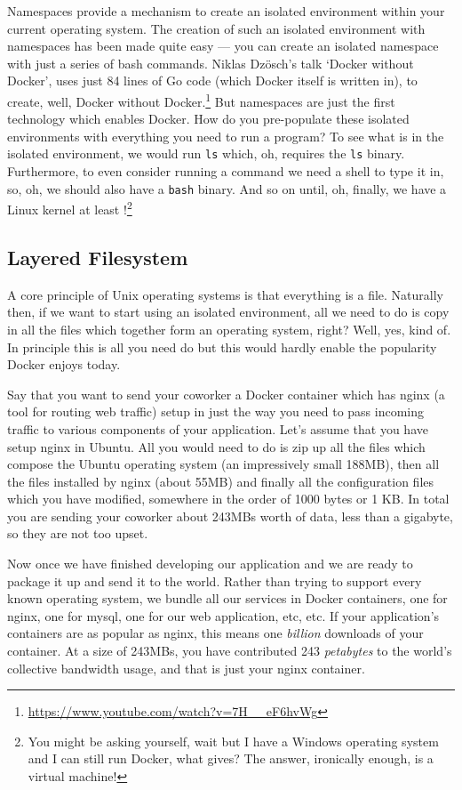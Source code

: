 Namespaces provide a mechanism to create an isolated environment within your current operating system.
The creation of such an isolated environment with namespaces has been made quite easy --- you can create an isolated namespace with just a series of bash commands.
Niklas Dz{\"o}sch's talk `Docker without Docker', uses just 84 lines of Go code (which Docker itself is written in),
to create, well, Docker without Docker.\footnote{\url{https://www.youtube.com/watch?v=7H__eF6hvWg}}
But namespaces are just the first technology which enables Docker.
How do you pre-populate these isolated environments with everything you need to run a program?
To see what is in the isolated environment, we would run \texttt{ls} which, oh, requires the \texttt{ls} binary.
Furthermore, to even consider running a command we need a shell to type it in, so, oh, we should also have a \texttt{bash} binary.
And so on until, oh, finally, we have a Linux kernel at least%
!\footnote{You might be asking yourself, wait but I have a Windows operating system and I can still run Docker, what gives? The answer, ironically enough, is a virtual machine!}

\subsection{Layered Filesystem}
A core principle of Unix operating systems is that everything is a file.
Naturally then, if we want to start using an isolated environment,
all we need to do is copy in all the files which together form an operating system, right?
Well, yes, kind of.
In principle this is all you need do but this would hardly enable the popularity Docker enjoys today.

Say that you want to send your coworker a Docker container which has nginx (a tool for routing web traffic)
setup in just the way you need to pass incoming traffic to various components of your application.
Let's assume that you have setup nginx in Ubuntu.
All you would need to do is zip up all the files which compose the Ubuntu operating system (an impressively small 188MB),
then all the files installed by nginx (about 55MB) and finally all the configuration files which you have modified,
somewhere in the order of 1000 bytes or 1 KB.
In total you are sending your coworker about 243MBs worth of data, less than a gigabyte, so they are not too upset.

Now once we have finished developing our application and we are ready to package it up and send it to the world.
Rather than trying to support every known operating system, we bundle all our services in Docker containers,
one for nginx, one for mysql, one for our web application, etc, etc.
If your application's containers are as popular as nginx, this means one \textit{billion} downloads of your container.
At a size of 243MBs, you have contributed 243 \textit{petabytes} to the world's collective bandwidth usage, and that is just your nginx container.


